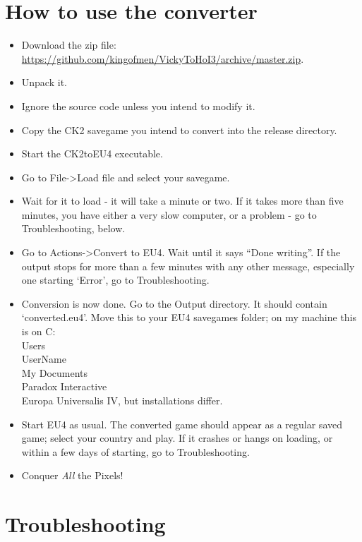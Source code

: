 \documentclass[12pt,ebook,oneside]{book}
\begin{document}
\section{How to use the converter}

\begin{itemize}
\item Download the zip file: \url{https://github.com/kingofmen/VickyToHoI3/archive/master.zip}.
\item Unpack it. 
\item Ignore the source code unless you intend to modify it. 
\item Copy the CK2 savegame you intend to convert into the release
  directory. 
\item Start the CK2toEU4 executable. 
\item Go to File->Load file and select your savegame. 
\item Wait for it to load - it will take a minute or two. If it takes
  more than five minutes, you have either a very slow computer, or a
  problem - go to Troubleshooting, below. 
\item Go to Actions->Convert to EU4. Wait until it says ``Done
  writing''. If the output stops for more than a few minutes with any
  other message, especially one starting `Error', go to
  Troubleshooting. 
\item Conversion is now done. Go to the Output directory. It should
  contain `converted.eu4'. Move this to your EU4 savegames folder; on
  my machine this is on C:\\Users\\UserName\\My Documents\\Paradox
  Interactive\\Europa Universalis IV, but installations differ. 
\item Start EU4 as usual. The converted game should appear as a
  regular saved game; select your country and play. If it crashes or
  hangs on loading, or within a few days of starting, go to
  Troubleshooting. 
\item Conquer \emph{All} the Pixels! 
\end{itemize}

\section{Troubleshooting}
\end{document}
